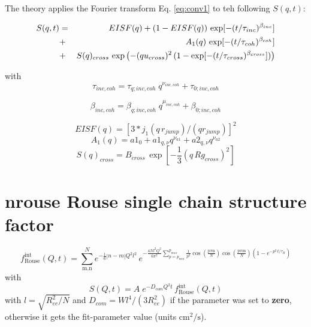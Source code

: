 \documentclass[11pt,fleqn]{book} %
\newcommand{\desc}[1]{\hskip 0.5cm {\color{descgray} #1}}
\begin{document}
The theory applies the Fourier transform Eq. \ref{eq:conv1} to teh following $S(q,t)$:

\begin{eqnarray}
S(q,t) &=& EISF(q)+(1-EISF(q)) \, \exp[-(t/\tau_{inc})^{\beta_{inc}}]  \cr
           &+&  A_1(q) \, \exp[-(t/\tau_{coh})^{\beta_{coh}}]       \cr
           &+&  S(q)_{cross} \, \exp \left (   -(q u_{cross})^2 \,(1-\exp[-(t/\tau_{cross})^{\beta_{cross}}]) \right )  
\end{eqnarray}

with
\begin{equation}
 \tau_{inc,coh}    = \tau_{q;inc,coh} \;  q^{\nu_{inc,coh}} + \tau_{0;inc,coh}
\end{equation}

\begin{equation}
 \beta_{inc,coh}    = \beta_{q;inc,coh} \;  q^{\mu_{inc,coh}} + \beta_{0;inc,coh}
\end{equation}

\begin{equation}   
      EISF(q)       = [ 3  * j_1(q \,r_{jump}) / (q  r_{jump}) ]^2
\end{equation}
\begin{equation}
      A_1(q)         = a1_0  +  a1_{q,\nu}  q^{\nu_{a1}} + a2_{q,\nu}  q^{\nu_{a2}}
\end{equation}
\begin{equation}
      S(q)_{cross}      = B_{cross} \, \exp[ -\frac{1}{3} (q \,Rg_{cross})^2]
\end{equation}



\chapter{nrouse \desc{Rouse single chain structure factor }}


\begin{exercise}


\begin{equation}
\label{eq:rous}
f_{\text{Rouse}}^{\text{int}}\left( Q,t \right)\mathbf{=}\sum_{\text{m,n}}^{N}{e^{ - \frac{1}{6}|n - m| Q^{2}l^{2} } } \, e^{ - \frac{4 N l^{2}Q^2}{6 \pi^{2}}\sum_{p=p_{min}}^{p_{max}}{\frac{1}{p^{2}}\cos\left( \frac{\text{p$\pi$n}}{N} \right)}\cos\left( \frac{\text{p$\pi$m}}{N} \right)\left( 1 - e^{ - p^{2}\,{t}/{\tau_{R}} } \right) }
\end{equation}
with
\begin{equation}
\label{eq:rousD}
S(Q,t) = A \;e^{ - D_{com} Q^{2} t }\,f_{\mathrm{Rouse}}^{\mathrm{int}}\left( Q,t \right)
\end{equation}
with  $ l = \sqrt{R_{ee}^2/N}  $  
and
$D_{com} = W l^4 / (3 R_{ee}^2) $ if the parameter was set to {\bf zero}, otherwise 
it gets the fit-parameter value (units $\mathrm{cm^2/s}$).
\end{exercise}
\end{document}
